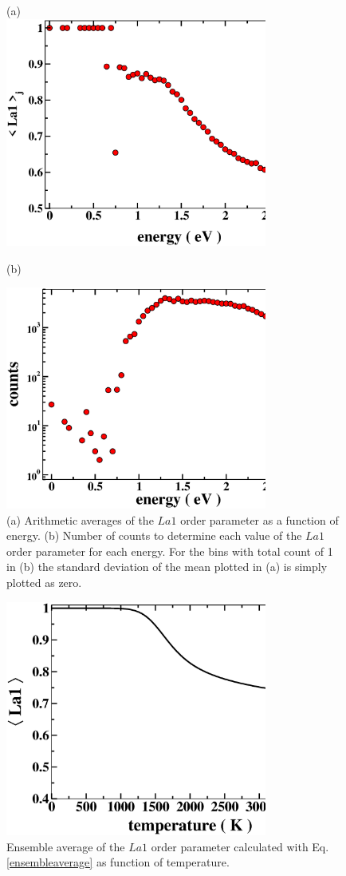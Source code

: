 \documentclass[aps,pre,reprint,superscriptaddress,showkeys]{revtex4-2}
\begin{document}
\begin{figure}[h!]
(a)\\
\vspace{1cm}
\includegraphics[width=8.6cm]{fig8a.eps}\\
\vspace{1cm}
\centerline{(b)}
\vspace{1cm}
\includegraphics[width=8.6cm]{fig8b.eps}
\caption{(a) Arithmetic averages of the $La1$ order parameter as a function of energy.  (b) Number of counts to determine each value of the $La1$ order parameter for each energy. For the bins with total count of 1 in (b) the standard deviation of the mean plotted in (a) is simply plotted as zero.  \label{arithemetic_avg}}
\end{figure}

\begin{figure}[h!]
\includegraphics[width=8.6cm]{fig9.eps}
\caption{Ensemble average of the $La1$ order parameter calculated with Eq. \ref{ensembleaverage} as function of temperature. \label{ensembleOP}}
\end{figure}
\end{document}

